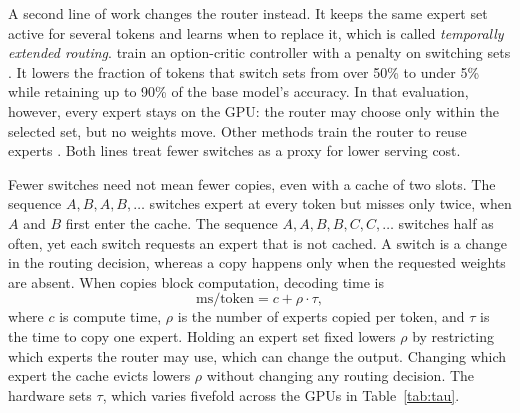\documentclass{article}
\newcommand{\xf}{\ensuremath{\rho}}
\begin{document}
A second line of work changes the router instead. It keeps the same expert set
active for several tokens and learns when to replace it, which is called
\emph{temporally extended routing}. \citet{shen2026temporally} train an
option-critic controller \citep{bacon2017optioncritic} with a penalty on
switching sets \citep{harb2018waiting}. It lowers the fraction of tokens that
switch sets from over 50\% to under 5\% while retaining up to 90\% of
the base model's accuracy. In
that evaluation, however, every expert stays on the GPU: the router may choose
only within the selected set, but no weights move. Other methods train the
router to reuse experts \citep{remoe2026,melinoe2026}. Both lines treat fewer
switches as a proxy for lower serving cost.

Fewer switches need not mean fewer copies, even with a cache of two slots. The
sequence $A,B,A,B,\ldots$ switches expert at every token but misses only
twice, when $A$ and $B$ first enter the cache. The sequence
$A,A,B,B,C,C,\ldots$ switches half as often, yet each switch requests an
expert that is not cached. A switch is a change in the routing decision,
whereas a copy happens only when the requested weights are absent. When copies
block computation, decoding time is
\begin{equation}
\label{eq:cost}
\text{ms/token} = c + \xf \cdot \tau,
\end{equation}
where $c$ is compute time, $\xf$ is the number of experts copied per token,
and $\tau$ is the time to copy one expert. Holding an expert set fixed lowers
$\xf$ by restricting which experts the router may use, which can change the
output. Changing which expert the cache evicts lowers $\xf$ without changing
any routing decision. The hardware sets $\tau$, which varies fivefold across
the GPUs in Table~\ref{tab:tau}.
\end{document}
